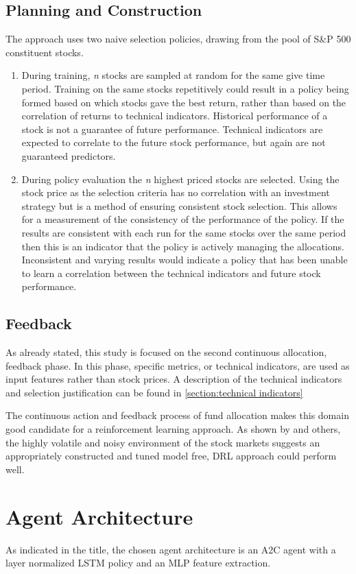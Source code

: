 \documentclass[oneside,12pt]{Classes/RoboticsLaTeX}
\begin{document}
\subsection{Planning and Construction}
The approach uses two naive selection policies, drawing from the pool of S\&P 500 constituent stocks.
\begin{enumerate}
    \item During training, \emph{n} stocks are sampled at random for the same give time period. Training on the same stocks repetitively could result in a policy being formed based on which stocks gave the best return, rather than based on the correlation of returns to technical indicators. Historical performance of a stock is not a guarantee of future performance. Technical indicators are expected to correlate to the future stock performance, but again are not guaranteed predictors.
    \item During policy evaluation the \emph{n} highest priced stocks are selected. Using the stock price as the selection criteria has no correlation with an investment strategy but is a method of ensuring consistent stock selection. This allows for a measurement of the consistency of the performance of the policy. If the results are consistent with each run for the same stocks over the same period then this is an indicator that the policy is actively managing the allocations.  Inconsistent and varying results would indicate a policy that has been unable to learn a correlation between the technical indicators and future stock performance.
\end{enumerate}

\subsection{Feedback}
As already stated, this study is focused on the second continuous allocation, feedback phase. In this phase, specific metrics, or technical indicators, are used as input features rather than stock prices. A description of the technical indicators and selection justification can be found in \ref{section:technical indicators}

The continuous action and feedback process of fund allocation makes this domain good candidate for a reinforcement learning approach.  As shown by \citet{MoodyJohn1998Pfar} and others, the highly volatile and noisy environment of the stock markets suggests an appropriately constructed and tuned model free, DRL approach could perform well.
\newpage
\section{Agent Architecture} \label{section:agentarch}
As indicated in the title, the chosen agent architecture is an A2C agent with a layer normalized LSTM policy and an MLP feature extraction.
\end{document}
